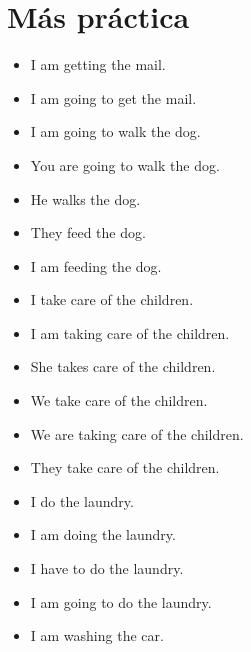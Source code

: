 \section{Más práctica}%
\label{sec:Más práctica}

\begin{itemize}
	\item {} \arr I am getting the mail.
	\item {} \arr I am going to get the mail.
	\item {} \arr I am going to walk the dog.
	\item {} \arr You are going to walk the dog.
	\item {} \arr He walks the dog.
	\item {} \arr They feed the dog.
	\item {} \arr I am feeding the dog.
	\item {} \arr I take care of the children.
	\item {} \arr I am taking care of the children.
	\item {} \arr She takes care of the children.
	\item {} \arr We take care of the children.
	\item {} \arr We are taking care of the children.
	\item {} \arr They take care of the children.
	\item {} \arr I do the laundry.
	\item {} \arr I am doing the laundry.
	\item {} \arr I have to do the laundry.
	\item {} \arr I am going to do the laundry.
	\item {} \arr I am washing the car.
\end{itemize}

